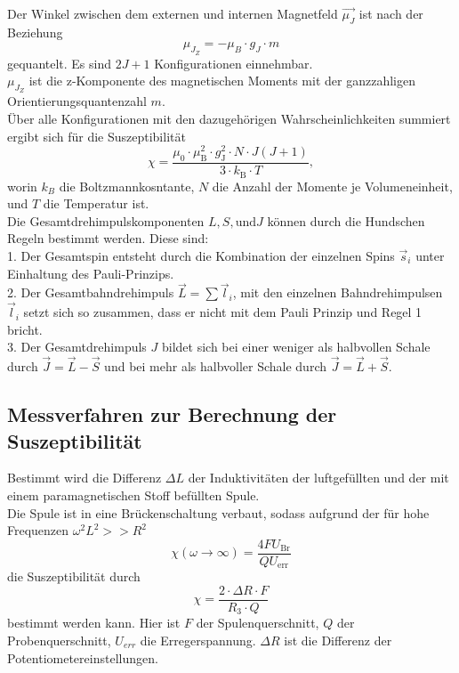 Der Winkel zwischen dem externen und internen Magnetfeld $\vec{\mu_J}$ ist nach der Beziehung
\begin{equation*}
    \mu_{J_Z} = - \mu_B \cdot g_J \cdot m
\end{equation*}
gequantelt. Es sind $2J+1$ Konfigurationen einnehmbar.\\
$\mu_{J_Z}$ ist die z-Komponente des magnetischen Moments mit der ganzzahligen Orientierungsquantenzahl
$m$.\\
Über alle Konfigurationen mit den dazugehörigen Wahrscheinlichkeiten summiert
ergibt sich für die Suszeptibilität 
\begin{equation}
    \chi = \frac{\mu_0 \cdot \mu_{\text{B}}^2 \cdot g_{\text{J}}^2 \cdot N \cdot  J (J+1)}{3 \cdot k_{\text{B}} \cdot T},
    \label{eq:sus}
\end{equation} 
worin $k_B$ die Boltzmannkosntante, $N$ die Anzahl der Momente je Volumeneinheit,
und $T$ die Temperatur ist.\\
Die Gesamtdrehimpulskomponenten $L, S, \textrm{und} J$ können durch die Hundschen Regeln bestimmt werden. Diese sind:\\
1. Der Gesamtspin entsteht durch die Kombination der einzelnen Spins $\vec s_{i}$ unter Einhaltung des Pauli-Prinzips.\\
2. Der Gesamtbahndrehimpuls $\vec L =\sum \vec l_{i}$, mit den einzelnen Bahndrehimpulsen $\vec l_{i}$ setzt sich so zusammen, dass er nicht mit dem Pauli Prinzip und Regel 1 bricht. \\
3. Der Gesamtdrehimpuls $J$ bildet sich bei einer weniger als halbvollen Schale durch $\vec J=\vec L - \vec S$ und bei mehr als halbvoller Schale durch $\vec J =\vec L + \vec S$.


\subsection{Messverfahren zur Berechnung der Suszeptibilität}

Bestimmt wird die Differenz $\Delta L$ der Induktivitäten
der luftgefüllten und der mit einem paramagnetischen Stoff befüllten Spule.\\
Die Spule ist in eine Brückenschaltung verbaut, sodass aufgrund der  für hohe Frequenzen $\omega^2 L^2 >> R^2$
\begin{equation*}
    \chi (\omega \to \infty) = \frac{4 F U_\text{Br}}{Q U_\text{err}}
\end{equation*}
die Suszeptibilität durch
\begin{equation}
    \chi = \frac{2 \cdot \Delta R \cdot F}{R_3\cdot Q}
    \label{eq:alternativ}
\end{equation}
bestimmt werden kann. Hier ist $F$ der Spulenquerschnitt, $Q$ der 
Probenquerschnitt, $U_{err}$ die Erregerspannung. $\Delta R$ ist die Differenz der Potentiometereinstellungen.\\

